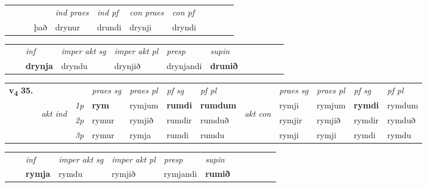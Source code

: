 \begin{tabular}{llllllllllll}
 & &  & &  \textit{ind praes} & \textit{ind pf} & \textit{con praes} & \textit{con pf} \\*
&  & & það & drynur & drundi & drynji & dryndi \\*
\cmidrule{5-9}
\end{tabular}


\begin{tabular}{llllllllllll}
 & & \textit{inf} & \textit{imper akt sg} & \textit{imper akt pl}   & \textit{presp} & \textit{supin}       \\*
  & & \textbf{drynja} & dryndu  & drynjið   & drynjandi &  \textbf{drunið}   \\*
\cmidrule{1-12}
\end{tabular}



\begin{tabular}{llllllllllll} \toprule
\multirow{4}{*}{{{\textbf{v{\textsubscript{4}}} \Large{\textbf{35.}}}}}  & &   &  \textit{praes sg}  & \textit{praes pl}  &\textit{ pf sg} & \textit{pf pl} &  &  \textit{praes sg}  & \textit{praes pl}  & \textit{pf sg} & \textit{pf pl } \\*
	\cmidrule{4-7} \cmidrule{9-12}
 & \multirow{3}{*}{\begin{turn}{90}\textit{akt ind}\end{turn}} & {\textit{1p}} & \textbf{rym} & rymjum    & \textbf{rumdi} & \textbf{rumdum} & \multirow{3}{*}{\begin{turn}{90}\textit{akt con}\end{turn}} &rymji & rymjum & \textbf{rymdi} & rymdum\\*
& &  {\textit{2p}} &  rymur  & rymjið   & rumdir & rumduð & & rymjir & rymjið & rymdir & rymduð \\*
& &  {\textit{3p}} & rymur & rymja   & rumdi & rumdu & & rymji & rymji& rymdi & rymdu  \\*
\cmidrule{4-7} \cmidrule{9-12}
\end{tabular}


\begin{tabular}{llllllllllll}
 & & \textit{inf} & \textit{imper akt sg} & \textit{imper akt pl}   & \textit{presp} & \textit{supin}       \\*
  & & \textbf{rymja} & rymdu  & rymjið   & rymjandi &  \textbf{rumið}   \\*
\cmidrule{1-12}
\end{tabular}



